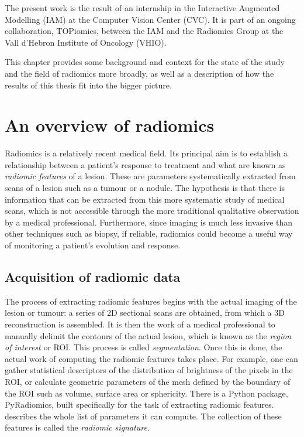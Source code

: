 \documentclass[../main.tex]{subfiles}
\begin{document}
The present work is the result of an internship in the Interactive Augmented Modelling
(IAM) at the Computer Vision Center (CVC). It is part of an ongoing collaboration,
TOPiomics, between the IAM and the Radiomics Group at the Vall d'Hebron Institute of
Oncology (VHIO).  

This chapter provides some background and context for the state of the study and the
field of radiomics more broadly, as well as a description of how the results of this
thesis fit into the bigger picture. 

\section{An overview of radiomics}
Radiomics is a relatively recent medical field. Its principal aim is to establish a
relationship between a patient's response to treatment and what are known as
\emph{radiomic features} of a lesion. These are parameters systematically extracted from
scans of a lesion such as a tumour or a nodule. The hypothesis is that there is information
that can be extracted from this more systematic study of medical scans, which is not
accessible through the more traditional qualitative observation by a medical professional.
Furthermore, since imaging is much less invasive than other techniques such as biopsy, if
reliable, radiomics could become a useful way of monitoring a patient's evolution and
response. 

\subsection{Acquisition of radiomic data}
The process of extracting radiomic features begins with the actual imaging of the lesion
or tumour: a series of 2D sectional scans are obtained, from which a 3D reconstruction is
assembled. It is then the work of a medical professional to manually delimit the contours
of the actual lesion, which is known as the \emph{region of interest} or ROI. This process is
called \emph{segmentation}. Once this is done, the actual work of computing the radiomic
features takes place. For example, one can gather statistical descriptors of the
distribution of brightness of the pixels in the ROI, or calculate geometric parameters of
the mesh defined by the boundary of the ROI such as volume, surface area or sphericity.
There is a Python package, \textsf{PyRadiomics}, built specifically for the task of
extracting radiomic features. \cite{pyradiomics} describes the whole list of parameters it
can compute. The collection of these features is called the \emph{radiomic signature}. 
\end{document}
